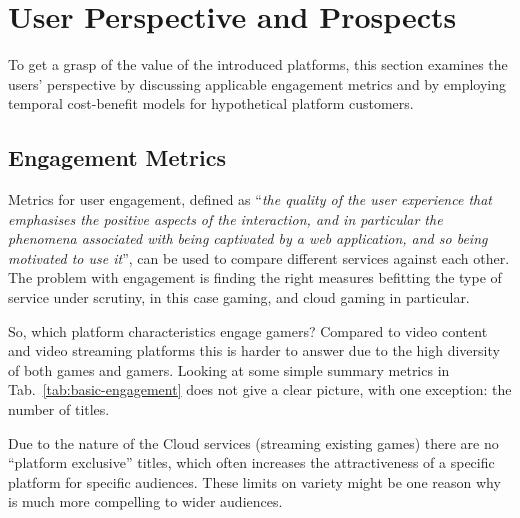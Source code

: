 \section{User Perspective and Prospects}
\label{sec:engagement}

To get a grasp of the value of the introduced platforms, this section examines the users' perspective by discussing applicable engagement metrics and by employing temporal cost-benefit models for hypothetical platform customers.



\subsection{Engagement Metrics}

Metrics for user engagement, defined as ``\textit{the quality of the user experience that emphasises the positive aspects of the interaction, and in particular the phenomena associated with being captivated by a web application, and so being motivated to use it}''\cite{Lehmann2012}, can be used to compare different services against each other. The problem with engagement is finding the right measures befitting the type of service under scrutiny, in this case gaming, and cloud gaming in particular.

So, which platform characteristics engage gamers? Compared to video content and video streaming platforms this is harder to answer due to the high diversity of both games and  gamers. Looking at some simple summary metrics in Tab.~\ref{tab:basic-engagement} does not give a clear picture, with one exception: the number of titles. 

Due to the nature of the Cloud services (streaming existing games) there are no ``platform exclusive'' titles, which often increases the attractiveness of a specific platform for specific audiences. These limits on variety might be one reason why \steam is much more compelling to wider audiences.




